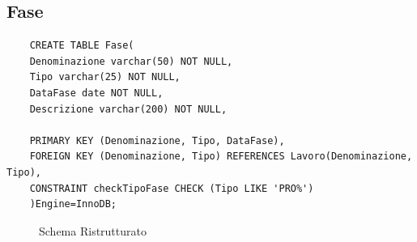 \documentclass{elegantbook}
\begin{document}
\subsection{Fase}
\begin{verbatim}
	CREATE TABLE Fase(
	Denominazione varchar(50) NOT NULL,
	Tipo varchar(25) NOT NULL,
	DataFase date NOT NULL,
	Descrizione varchar(200) NOT NULL,
	
	PRIMARY KEY (Denominazione, Tipo, DataFase),
	FOREIGN KEY (Denominazione, Tipo) REFERENCES Lavoro(Denominazione, Tipo),
	CONSTRAINT checkTipoFase CHECK (Tipo LIKE 'PRO%')
	)Engine=InnoDB;
\end{verbatim}
\begin{figure}[H]
	\centering
	\caption{Schema Ristrutturato}
\end{figure}
\end{document}
